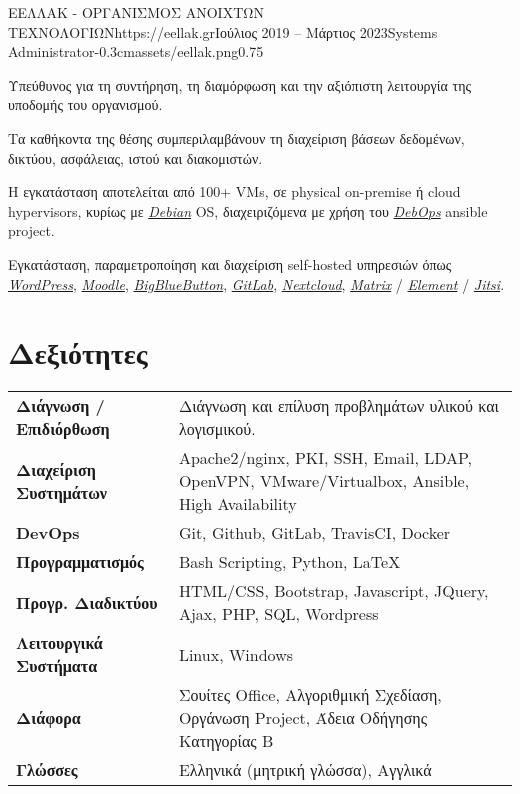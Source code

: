 \documentclass{mycv}
\begin{document}
	\vspace{0.75cm}

	\begin{EntryDatedLogo}{ΕΕΛΛΑΚ - ΟΡΓΑΝΙΣΜΟΣ ΑΝΟΙΧΤΩΝ ΤΕΧΝΟΛΟΓΙΩΝ}{https://eellak.gr}{Ιούλιος 2019 -- Μάρτιος 2023}{Systems Administrator}{-0.3cm}{assets/eellak.png}{0.75}
		\vspace{-0.2cm}
		\begin{Itemize}
			\item Υπεύθυνος για τη συντήρηση, τη διαμόρφωση και την αξιόπιστη λειτουργία της υποδομής του οργανισμού.
			\item Τα καθήκοντα της θέσης συμπεριλαμβάνουν τη διαχείριση βάσεων δεδομένων, δικτύου, ασφάλειας, ιστού και διακομιστών.
			\item Η εγκατάσταση αποτελείται από 100+ VMs, σε physical on-premise ή cloud hypervisors, κυρίως με \href{https://www.debian.org}{\textit{Debian}} OS, διαχειριζόμενα με χρήση του \href{https://debops.org}{\textit{DebOps}} ansible project.
			\item Εγκατάσταση, παραμετροποίηση και διαχείριση self-hosted υπηρεσιών όπως \href{https://wordpress.com}{\textit{WordPress}}, \href{https://moodle.org}{\textit{Moodle}}, \href{https://bigbluebutton.org}{\textit{BigBlueButton}}, \href{https://about.gitlab.com/install/}{\textit{GitLab}}, \href{https://nextcloud.com}{\textit{Nextcloud}}, \href{https://matrix.org}{\textit{Matrix}} / \href{https://element.io}{\textit{Element}} / \href{https://jitsi.org}{\textit{Jitsi}}.
		\end{Itemize}
	\end{EntryDatedLogo}

	\section{Δεξιότητες}
	\begin{tabular}{m{4.5cm} m{12.5cm}}
		\textbf{Διάγνωση / Επιδιόρθωση}     & Διάγνωση και επίλυση προβλημάτων υλικού και λογισμικού. \\
		\textbf{Διαχείριση Συστημάτων}		& Apache2/nginx, PKI, SSH, Email, LDAP, OpenVPN, VMware/Virtualbox, Ansible, High Availability \\
		\textbf{DevOps}	                    & Git, Github, GitLab, TravisCI, Docker \\
		\textbf{Προγραμματισμός} 	 	  	& Bash Scripting, Python, \LaTeX \\
		\textbf{Προγρ. Διαδικτύου}	  		& HTML/CSS, Bootstrap, Javascript, JQuery, Ajax, PHP, SQL, Wordpress \\
		\textbf{Λειτουργικά Συστήματα}   	& Linux, Windows \\
		\textbf{Διάφορα}        		 	& Σουίτες Office, Αλγοριθμική Σχεδίαση, Οργάνωση Project, Άδεια Οδήγησης Κατηγορίας Β \\
		\textbf{Γλώσσες} 			   		& Ελληνικά (μητρική γλώσσα), Αγγλικά 
	\end{tabular}
\end{document}
